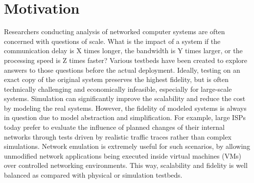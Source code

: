 \section{Motivation}
\label{VT:Sec:Intro}

Researchers conducting analysis of networked computer systems are often concerned with questions of scale.
What is the impact of a system if the communication delay is X times longer, the bandwidth is Y times larger, or the processing speed is Z times faster? 
Various testbeds have been created to explore answers to those questions before the actual deployment.
Ideally, testing on an exact copy of the original system preserves the highest fidelity,
but is often technically challenging and economically infeasible, especially for large-scale systems. 
Simulation can significantly improve the scalability and reduce the cost by modeling the real systems.
However, the fidelity of modeled systems is always in question due to model abstraction and simplification. 
For example, large ISPs today prefer to evaluate the influence of planned changes of their internal networks
through tests driven by realistic traffic traces rather than complex simulations. 
Network emulation is extremely useful for such scenarios, by allowing unmodified network
applications being executed inside virtual machines (VMs) over controlled networking environments.
This way, scalability and fidelity is well balanced as compared with physical or simulation testbeds.


